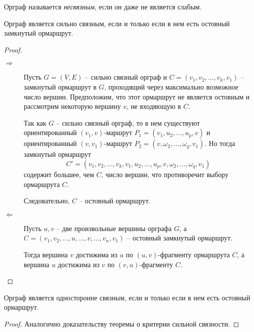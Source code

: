 \begin{definition}
    Орграф называется \emph{несвязным}, если он даже не является слабым.
\end{definition}

\begin{theorem}
    Орграф является сильно связным, если и только если в нем есть остовный замкнутый ормаршрут.
\end{theorem}

\begin{proof}\leavevmode
    \begin{description}
        \item[$ \boxed{\Rightarrow} $] Пусть $ G = (V,E) $ -- сильно связный орграф и $ C = (v_1,v_2,\ldots,v_k,v_1) $ -- замкнутый ормаршрут в $ G $, проходящий через максимально возможное число вершин. Предположим, что этот ормаршрут не является остовным и рассмотрим некоторую вершину $ v $, не входяющую в $ C $.

              Так как $ G $ -- сильно связный орграф, то в нем существуют ориентированный $ (v_1,v) $-маршрут $ P_1 = (v_1,u_2,\ldots,u_p,v) $ и ориентированный $ (v,v_1) $-маршрут $ P_2 = (v,\omega_2,\ldots,\omega_q,v_1) $. Но тогда замкнутый ормаршрут
              \[
                  C' = (v_1,v_2,\ldots,v_k,v_1,u_2,\ldots,u_p,v,\omega_2,\ldots,\omega_q,v_1)
              \]
              содержит большее, чем $ C $, число вершин, что противоречит выбору ормаршрута $ C $.

              Следовательно, $ C $ -- остовный ормаршрут.

        \item[$ \boxed{\Leftarrow} $] Пусть $ u,v $ -- две произвольные вершины орграфа $ G $, а \\ $ C = (v_1,v_2,\ldots,u,\ldots,v,\ldots,v_n,v_1) $ -- остовный замкнутый ормаршрут.

              Тогда вершина $ v $ достижима из $ u $ по $ (u,v) $-фрагменту ормаршрута $ C $, а вершина $ u $ достижима из $ v $ по $ (v,u) $-фрагменту $ C $.
    \end{description}
\end{proof}

\begin{theorem}
    Орграф является односторонне связным, если и только если в нем есть остовный ормаршрут.
\end{theorem}

\begin{proof}
    Аналогично доказательству теоремы о критерии сильной связности.
\end{proof}

